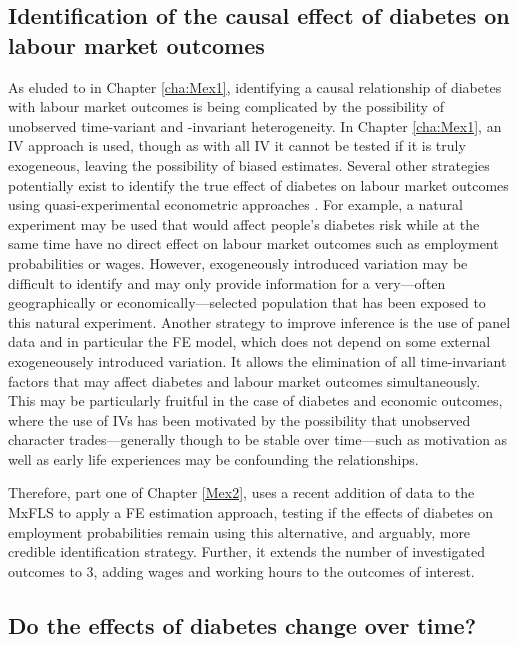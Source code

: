 \subsection{Identification of the causal effect of diabetes on labour market outcomes}

As eluded to in Chapter \ref{cha:Mex1}, identifying a causal relationship of diabetes with labour market outcomes is being complicated by the possibility of unobserved time-variant and -invariant heterogeneity. In Chapter \ref{cha:Mex1}, an \ac{IV} approach is used, though as with all \ac{IV} it cannot be tested if it is truly exogeneous, leaving the possibility of biased estimates. Several other strategies potentially exist to identify the true effect of diabetes on labour market outcomes using quasi-experimental econometric approaches \parencite{Antonakis2012}. For example, a natural experiment may be used that would affect people's diabetes risk while at the same time have no direct effect on labour market outcomes such as employment probabilities or wages. However, exogeneously introduced variation may be difficult to identify and may only provide information for a very---often geographically or economically---selected population that has been exposed to this natural experiment. Another strategy to improve inference is the use of panel data and in particular the \ac{FE} model, which does not depend on some external exogeneousely introduced variation. It allows the elimination of all time-invariant factors that may affect diabetes and labour market outcomes simultaneously. This may be particularly fruitful in the case of diabetes and economic outcomes, where the use of \ac{IV}s has been motivated by the possibility that unobserved character trades---generally though to be stable over time---such as motivation as well as early life experiences may be confounding the relationships.

Therefore, part one of Chapter \ref{Mex2}, uses a recent addition of data to the \ac{MxFLS} to apply a \ac{FE} estimation approach, testing if the effects of diabetes on employment probabilities remain using this alternative, and arguably, more credible identification strategy. Further, it extends the number of investigated outcomes to 3, adding wages and working hours to the outcomes of interest.

\subsection{Do the effects of diabetes change over time?}

